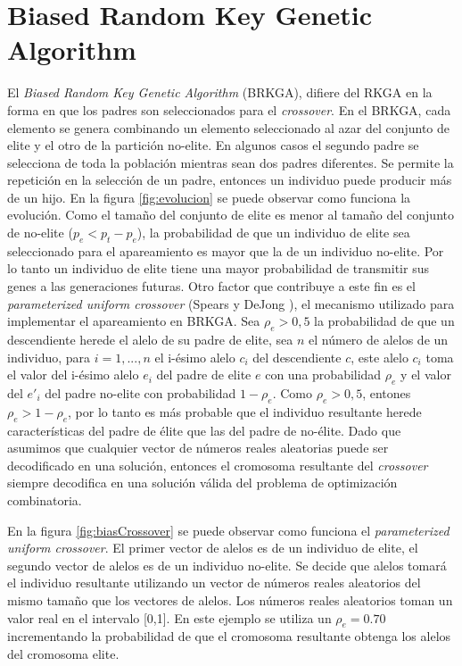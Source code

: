\section{Biased Random Key Genetic Algorithm}\label{sec:brkga}

El \textit{Biased Random Key Genetic Algorithm} (BRKGA), difiere del RKGA en la forma en que los padres son seleccionados para el \textit{crossover}. En el BRKGA, cada elemento se genera combinando un elemento seleccionado al azar del conjunto de elite y el otro de la partición no-elite. En algunos casos el segundo padre se selecciona de toda la población mientras sean dos padres diferentes. Se permite la repetición en la selección de un padre, entonces un individuo puede producir más de un hijo. En la figura \ref{fig:evolucion} se puede observar como funciona la evolución. Como el tamaño del conjunto de elite es menor al tamaño del conjunto de no-elite ($p_e < p_t - p_e$), la probabilidad de que un individuo de elite sea seleccionado para el apareamiento es mayor que la de un individuo no-elite. Por lo tanto un individuo de elite tiene una mayor probabilidad de transmitir sus genes a las generaciones futuras. Otro factor que contribuye a este fin es el \textit{parameterized uniform crossover} (Spears y DeJong \cite{SpearsDeJong}), el mecanismo utilizado para implementar el apareamiento en BRKGA. Sea $\rho_e > 0,5$ la probabilidad de que un descendiente herede el alelo de su padre de elite, sea $n$ el número de alelos de un individuo, para $i =1,...,n$ el i-ésimo alelo $c_i$ del descendiente $c$, este alelo $c_i$ toma el valor del i-ésimo alelo $e_i$ del padre de elite $e$ con una probabilidad $\rho_e$ y el valor del $e'_i$ del padre no-elite con probabilidad $1-\rho_e$. Como $\rho_e > 0,5$, entones $\rho_e > 1 - \rho_e$, por lo tanto es más probable que el individuo resultante herede características del padre de élite que las del padre de no-élite. Dado que asumimos que cualquier vector de números reales aleatorias puede ser decodificado en una solución, entonces el cromosoma resultante del \textit{crossover} siempre decodifica en una solución válida del problema de optimización combinatoria. 

\bigskip

En la figura \ref{fig:biasCrossover} se puede observar como funciona el \textit{parameterized uniform crossover}. El primer vector de alelos es de un individuo de elite, el segundo vector de alelos es de un individuo no-elite. Se decide que alelos tomará el individuo resultante utilizando un vector de números reales aleatorios del mismo tamaño que los vectores de alelos. Los números reales aleatorios toman un valor real en el intervalo [0,1]. En este ejemplo se utiliza un $\rho_e = 0.70$ incrementando la probabilidad de que el cromosoma resultante obtenga los alelos del cromosoma elite.

